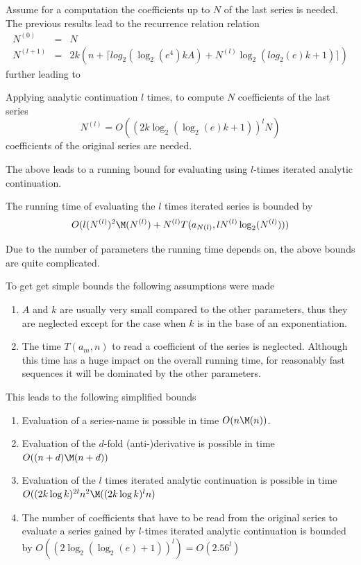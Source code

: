 		Assume for a computation the coefficients up to $N$ of the last series is needed. 
		The previous results lead to the recurrence relation
		relation 
		\begin{eqnarray*}
			N^{(0)} &=& N \\
			N^{(l+1)} &=& 2k\left( n+\lceil log_2(\log_2 (e^4) kA) + N^{(l)} \log_2(log_2(e)k+1)\rceil \right)
		\end{eqnarray*}
		further leading to
		\begin{theorem}
			Applying analytic continuation $l$ times, to compute $N$ coefficients of the last series 
			\begin{equation}
				N^{(l)} = O((2k \log_2 (\log_2 (e)k +1))^lN) 
			\end{equation}
			coefficients of the original series are needed.
		\end{theorem}
		The above leads to a running bound for evaluating using $l$-times iterated analytic continuation.
		\begin{theorem}
			The running time of evaluating the $l$ times iterated series is bounded by
			\begin{equation}
				 O(l(N^{(l)})^2\M(N^{(l)})+N^{(l)}T(a_{N(l)}, l N^{(l)}\log_2(N^{(l)}))) 
			\end{equation}
		\end{theorem}
		Due to the number of parameters the running time depends on, the above bounds are quite complicated.
    
		To get get simple bounds the following assumptions were made
		\begin{enumerate}
			\item $A$ and $k$ are usually very small compared to the other parameters, 
			thus they are neglected except for the case when $k$ is in the base of an exponentiation.
			\item The time $T(a_m, n)$ to read a coefficient of the series is neglected. 
			Although this time has a huge impact on the overall running time, for reasonably fast sequences it 
			will be dominated by the other parameters.
		\end{enumerate}
		This leads to the following simplified bounds
		\begin{enumerate}
			\item Evaluation of a series-name is possible in time $O(n\M(n))$.
			\item Evaluation of the $d$-fold (anti-)derivative is possible in time $O((n+d)\M(n+d))$
			\item Evaluation of the $l$ times iterated analytic continuation is possible in time $O((2k \log k)^{2l}n^2\M((2k\log k)^ln)$
			\item The number of coefficients that have to be read from the original series to evaluate a series gained by 
			$l$-times iterated analytic continuation is bounded by $O((2\log_2(\log_2(e)+1))^l) = O(2.56^l)$
		\end{enumerate}

